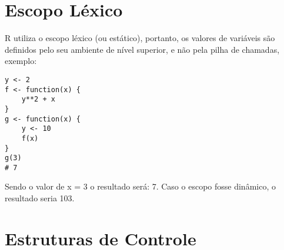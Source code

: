 \documentclass[12pt]{article}
\begin{document}
\section{Escopo Léxico} \label{sec:Escopo Lexico}
    R utiliza o escopo léxico (ou estático), portanto, os valores de variáveis são definidos pelo seu ambiente de nível superior, e não pela pilha de chamadas, exemplo:
    \begin{verbatim}
y <- 2
f <- function(x) {
    y**2 + x
}
g <- function(x) {
    y <- 10
    f(x)
}
g(3)
# 7
    \end{verbatim}
Sendo o valor de x = 3 o resultado será: 7. Caso o escopo fosse dinâmico, o resultado seria 103.

\section{Estruturas de Controle} \label{sec:Comandos de Execução}
\end{document}
